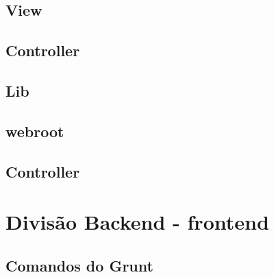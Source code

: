         \subsection{View\label{sec:app-view}}

        \subsection{Controller\label{sec:app-controller}}

        \subsection{Lib\label{sec:app-lib}}

        \subsection{webroot\label{sec:app-lib}}


        \subsection{Controller\label{sec:app-controller}}


    \section{Divisão Backend - frontend\label{sec:back-front}}


        \subsection{Comandos do Grunt\label{sub:comandos-grunt}}
